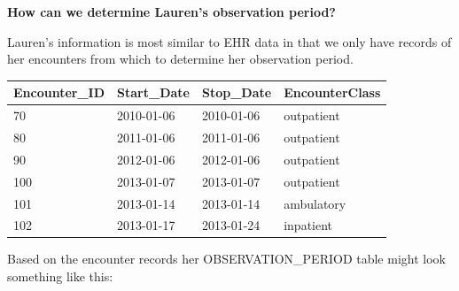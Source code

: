 \documentclass[]{book}
\begin{document}
\textbf{How can we determine Lauren's observation period?}

Lauren's information is most similar to EHR data in that we only have
records of her encounters from which to determine her observation
period.

\begin{longtable}[]{@{}llll@{}}
\toprule
Encounter\_ID & Start\_Date & Stop\_Date & EncounterClass\tabularnewline
\midrule
\endhead
70 & 2010-01-06 & 2010-01-06 & outpatient\tabularnewline
80 & 2011-01-06 & 2011-01-06 & outpatient\tabularnewline
90 & 2012-01-06 & 2012-01-06 & outpatient\tabularnewline
100 & 2013-01-07 & 2013-01-07 & outpatient\tabularnewline
101 & 2013-01-14 & 2013-01-14 & ambulatory\tabularnewline
102 & 2013-01-17 & 2013-01-24 & inpatient\tabularnewline
\bottomrule
\end{longtable}

Based on the encounter records her OBSERVATION\_PERIOD table might look
something like this:
\end{document}

